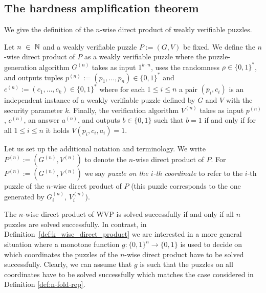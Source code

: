 \subsection{The hardness amplification theorem}
We give the definition of the $n$-wise direct product of weakly verifiable puzzles.
%
\begin{definition}
  \label{def:n-fold-rep}
  Let $n~\in~\mathbb{N}$ and a weakly verifiable puzzle $P := (G,V)$ be fixed.
  We define the $n$-wise direct product of $P$ as a weakly verifiable puzzle where the puzzle-generation algorithm
  $G^{(n)}$ takes as input $1^{k \cdot n}$, uses the randomness $\rho \in \{0,1\}^{*}$,
  and outputs tuples $p^{(n)} := (p_1, \dotsc, p_n) \in \{0,1\}^{*}$ and $c^{(n)} := (c_1, \dotsc, c_k) \in \{0,1\}^{*}$
  where for each $1 \leq i \leq n$ a pair $(p_i, c_i)$ is an independent instance of a weakly verifiable puzzle defined by $G$ and $V$ with the security parameter $k$.
  Finally, the verification algorithm $V^{(n)}$ takes as input $p^{(n)}$, $c^{(n)}$, an answer $a^{(n)}$, and outputs $b \in \{0,1\}$
  such that $b = 1$ if and only if for all $1 \leq i \leq n$ it holds $V(p_i, c_i, a_i) = 1$.
 \end{definition}
%
Let us set up the additional notation and terminology. We write $P^{(n)} := (G^{(n)}, V^{(n)})$ to denote the $n$-wise direct product of $P$.
For $P^{(n) } := (G^{(n)},V^{(n)})$ we say \textit{puzzle on the $i$-th coordinate} to refer to the $i$-th puzzle of the $n$-wise direct product of $P$
(this puzzle corresponds to the one generated by $G^{(n)}_i$,  $V^{(n)}_i$).

The $n$-wise direct product of WVP is solved successfully if and only if all $n$ puzzles are solved successfully.
In contrast, in Definition~\ref{def:k_wise_direct_product} we are interested in a more general situation where a monotone function $g: \{0,1\}^{n} \rightarrow \{0,1\}$
is used to decide on which coordinates the puzzles of the $n$-wise direct product have to be solved successfully.
Clearly, we can assume that $g$ is such that the puzzles on all coordinates have to be solved successfully
which matches the case considered in Definition \ref{def:n-fold-rep}.

